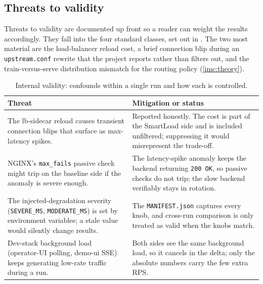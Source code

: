 \subsection{Threats to validity}\label{imc:threats}

Threats to validity are documented up front so a reader can weight the results
accordingly. They fall into the four standard classes, set out in
. The two most material are
the load-balancer reload cost, a brief connection blip during an \texttt{upstream.conf}
rewrite that the project reports rather than filters out, and the train-versus-serve
distribution mismatch for the routing policy (\cref{imc:theory}).

\begin{table}[H]
  \centering
  \caption[Internal validity threats and controls]{Internal validity: confounds within a single run and how each is controlled.}
  \label{tab:imc:threats-internal}
  \small
  \begin{tabularx}{\linewidth}{@{}Y Y@{}}
    \toprule
    \textbf{Threat} & \textbf{Mitigation or status} \\
    \midrule
    The lb-sidecar reload causes transient connection blips that surface as max-latency spikes. & Reported honestly. The cost is part of the SmartLoad side and is included unfiltered; suppressing it would misrepresent the trade-off. \\
    NGINX's \texttt{max\_fails} passive check might trip on the baseline side if the anomaly is severe enough. & The latency-spike anomaly keeps the backend returning \texttt{200 OK}, so passive checks do not trip; the slow backend verifiably stays in rotation. \\
    The injected-degradation severity (\texttt{SEVERE\_MS}, \texttt{MODERATE\_MS}) is set by environment variables; a stale value would silently change results. & The \texttt{MANIFEST.json} captures every knob, and cross-run comparison is only treated as valid when the knobs match. \\
    Dev-stack background load (operator-UI polling, demo-ui SSE) keeps generating low-rate traffic during a run. & Both sides see the same background load, so it cancels in the delta; only the absolute numbers carry the few extra RPS. \\
    \bottomrule
  \end{tabularx}
\end{table}

